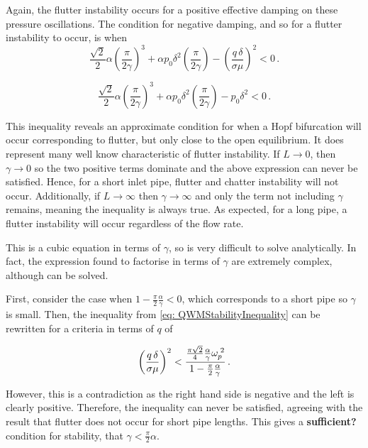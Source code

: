 Again, the flutter instability occurs for a positive effective damping on these pressure oscillations. The condition for negative damping, and so for a flutter instability to occur, is when
~
\begin{equation} \label{eq: QWMStabilityInequality}
    \frac{\sqrt{2}}{2} \alpha \left( \frac{\pi}{2 \gamma} \right)^3 + \alpha p_0 \delta^2 \left( \frac{\pi}{2 \gamma} \right) - \left( \frac{q \, \delta}{\sigma \mu} \right)^2 < 0 \, .
\end{equation}

\begin{equation*} %
    \frac{\sqrt{2}}{2} \alpha \left( \frac{\pi}{2 \gamma} \right)^3 + \alpha p_0 \delta^2 \left( \frac{\pi}{2 \gamma} \right) - p_0 \delta^2 < 0 \, .
\end{equation*}

This inequality reveals an approximate condition for when a Hopf bifurcation will occur corresponding to flutter, but only close to the open equilibrium. It does represent many well know characteristic of flutter instability. If $L \rightarrow 0$, then $\gamma \rightarrow 0$ so the two positive terms dominate and the above expression can never be satisfied. Hence, for a short inlet pipe, flutter and chatter instability will not occur. Additionally, if $L \rightarrow \infty$ then $\gamma \rightarrow \infty$ and only the term not including $\gamma$ remains, meaning the inequality is always true. As expected, for a long pipe, a flutter instability will occur regardless of the flow rate.

This is a cubic equation in terms of $\gamma$, so is very difficult to solve analytically. In fact, the expression found to factorise in terms of $\gamma$ are extremely complex, although can be solved.

First, consider the case when $1 - \frac{\pi}{2} \frac{\alpha}{\gamma} < 0$, which corresponds to a short pipe so $\gamma$ is small. Then, the inequality from \cref{eq: QWMStabilityInequality} can be rewritten for a criteria in terms of $q$ of

\begin{equation*}
    \left( \frac{q \, \delta}{\sigma \mu} \right)^2 < \frac{\frac{\pi \sqrt{2}}{4} \frac{\alpha}{\gamma} \omega_p^{\;2}}{1 - \frac{\pi}{2}\frac{\alpha}{\gamma}} \, .
\end{equation*}

However, this is a contradiction as the right hand side is negative and the left is clearly positive. Therefore, the inequality can never be satisfied, agreeing with the result that flutter does not occur for short pipe lengths. This gives a \textbf{sufficient?} condition for stability, that $\gamma < \frac{\pi}{2} \alpha$.

